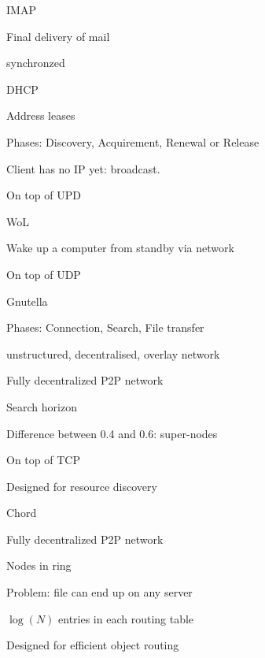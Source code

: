\documentclass[main.tex]{subfiles}
\begin{document}
\begin{card}{IMAP}
\item Final delivery of mail
\item synchronzed
\end{card}


\begin{card}{DHCP}
\item Address leases
\item Phases: Discovery, Acquirement, Renewal or Release
\item Client has no IP yet: broadcast.
\item On top of UPD
\end{card}




\begin{card}{WoL}
\item Wake up a computer from standby via network
\item On top of UDP
\end{card}




\begin{card}{Gnutella}
\item Phases: Connection, Search, File transfer
\item unstructured, decentralised, overlay network
\item Fully decentralized P2P network
\item Search horizon
\item Difference between 0.4 and 0.6: super-nodes
\item On top of TCP
\item Designed for resource discovery
\end{card}


\begin{card}{Chord}
\item Fully decentralized P2P network
\item Nodes in ring
\item Problem: file can end up on any server
\item $\log(N)$ entries in each routing table
\item Designed for efficient object routing
\end{card}
\end{document}
